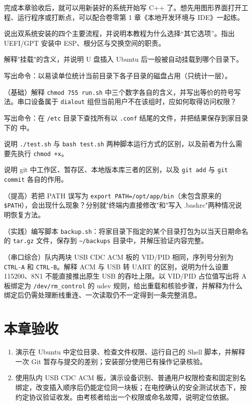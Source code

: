 \documentclass[
  lang=cn,
  scheme=chinese,
  chinesefont=ctexfont,
  11pt,
  oneside,
  device=normal,
  color=cyan,
  mode=fancy
]{../templates/elegantbook}
\begin{document}
完成本章验收后，就可以用新装好的系统开始写 C++ 了。想先用图形界面打开工程、运行程序或打断点，可以配合卷零第 1 章《本地开发环境与 IDE》一起练。

\begin{problemset}
\item \label{prob:v1-linux-1} 说出双系统安装的四个主要流程，并说明本教程为什么选择“其它选项”。指出 UEFI/GPT 安装中 ESP、根分区与交换空间的职责。
\item \label{prob:v1-linux-2} 解释"挂载"的含义，并说明 U 盘插入 Ubuntu 后一般被自动挂载到哪个目录下。
\item \label{prob:v1-linux-3} 写出命令：以易读单位统计当前目录下各子目录的磁盘占用（只统计一层）。
\item \label{prob:v1-linux-4} （基础）解释 \texttt{chmod 755 run.sh} 中三个数字各自的含义，并写出等价的符号写法。串口设备属于 \texttt{dialout} 组但当前用户不在该组时，应如何取得访问权限？
\item \label{prob:v1-linux-5} 写出命令：在 \texttt{/etc} 目录下查找所有以 \texttt{.conf} 结尾的文件，并把结果保存到家目录下的  中。
\item \label{prob:v1-linux-6} 说明 \texttt{./test.sh} 与 \texttt{bash test.sh} 两种脚本运行方式的区别，以及前者为什么需要先执行 \texttt{chmod +x}。
\item \label{prob:v1-linux-7} 说明 git 中工作区、暂存区、本地版本库三者的区别，以及 \texttt{git add} 与 \texttt{git commit} 各自的作用。
\item \label{prob:v1-linux-9} （提高）若把 PATH 误写为 \texttt{export PATH=/opt/app/bin}（未包含原来的 \texttt{\$PATH}），会出现什么现象？分别就"终端内直接修改"和"写入 .bashrc"两种情况说明恢复方法。
\item \label{prob:v1-linux-10} （实践）编写脚本 \texttt{backup.sh}：将家目录下指定的某个目录打包为以当天日期命名的 \texttt{tar.gz} 文件，保存到 \texttt{\textasciitilde/backups} 目录中，并解压验证内容完整。
\item \label{prob:v1-linux-11} （串口综合）队内两块 USB CDC ACM 板的 VID/PID 相同，序列号分别为 \texttt{CTRL-A} 和 \texttt{CTRL-B}。解释 ACM 与 USB 转 UART 的区别，说明为什么设置 115200、8N1 不能直接推出原生 USB 的吞吐上限。以 VID/PID 占位值写出将 A 板绑定为 \texttt{/dev/rm\_control} 的 udev 规则，给出重载和核验步骤，并解释为什么绑定后仍需处理断线重连、一次读取仍不一定得到一条完整消息。
\end{problemset}

\section{本章验收}
\begin{enumerate}
\item 演示在 Ubuntu 中定位目录、检查文件权限、运行自己的 Shell 脚本，并解释一次 Git 暂存与提交的差别；安装部分使用已有操作记录核验。
\item 使用队内 USB CDC ACM 板，演示设备识别、普通用户权限检查和固定别名绑定，改变插入顺序后仍能定位同一块板；在电控确认的安全测试状态下，按约定协议验证收发。由考核者给出一个权限或命名故障，说明定位依据。
\end{enumerate}
\end{document}
